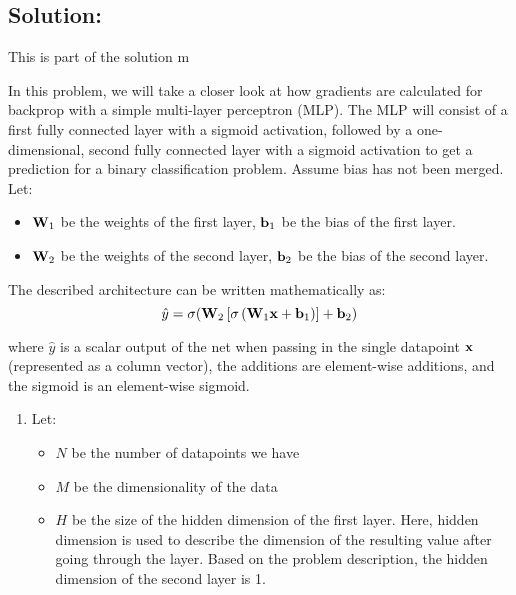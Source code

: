 \documentclass[submit]{harvardml}
\begin{document}
\subsection*{Solution:}

This is part of the solution m


\newpage

\begin{problem}

  In this problem, we will take a closer look at how gradients are calculated for backprop with a simple multi-layer perceptron (MLP). The MLP will consist of a first fully connected layer with a sigmoid activation, followed by a one-dimensional, second fully connected layer with a sigmoid activation to get a prediction for a binary classification problem. Assume bias has not been merged. Let:
  \begin{itemize}
      \item $\bold{W}_1$ be the weights of the first layer, $\bold{b}_1$ be the bias of the first layer.
      \item $\bold{W}_2$ be the weights of the second layer, $\bold{b}_2$ be the bias of the second layer.
  \end{itemize}
  
  The described architecture can be written mathematically as: $$\hat{y} = \sigma(\bold{W}_2 \left[\sigma \left(\bold{W}_1 \bold{x} + \bold{b}_1\right)\right] + \bold{b}_2)$$
  
  where $\hat{y}$ is a scalar output of the net when passing in the single datapoint $\bold{x}$ (represented as a column vector), the additions are element-wise additions, and the sigmoid is an element-wise sigmoid.
  
  \begin{enumerate}
      \item Let:
      \begin{itemize}
          \item $N$ be the number of datapoints we have
          \item $M$ be the dimensionality of the data
          \item $H$ be the size of the hidden dimension of the first layer. Here, hidden dimension is used to describe the dimension of the resulting value after going through the layer. Based on the problem description, the hidden dimension of the second layer is 1.
      \end{itemize}
      

\end{enumerate}
\end{problem}
\end{document}
